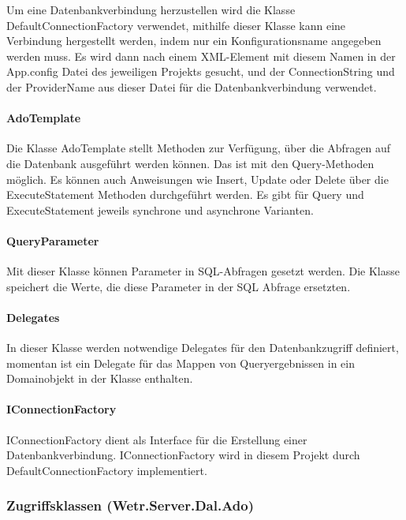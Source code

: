 Um eine Datenbankverbindung herzustellen wird die Klasse
DefaultConnectionFactory verwendet, mithilfe dieser Klasse kann eine
Verbindung hergestellt werden, indem nur ein Konfigurationsname
angegeben werden muss. Es wird dann nach einem XML-Element mit diesem
Namen in der App.config Datei des jeweiligen Projekts gesucht, und der
ConnectionString und der ProviderName aus dieser Datei für die
Datenbankverbindung verwendet.


\paragraph{AdoTemplate}\label{adotemplate}

Die Klasse AdoTemplate stellt Methoden zur Verfügung, über die Abfragen
auf die Datenbank ausgeführt werden können. Das ist mit den
Query-Methoden möglich. Es können auch Anweisungen wie Insert, Update
oder Delete über die ExecuteStatement Methoden durchgeführt werden. Es
gibt für Query und ExecuteStatement jeweils synchrone und asynchrone
Varianten.


\paragraph{QueryParameter}\label{queryparameter}

Mit dieser Klasse können Parameter in SQL-Abfragen gesetzt werden. Die
Klasse speichert die Werte, die diese Parameter in der SQL Abfrage
ersetzten.


\paragraph{Delegates}\label{delegates}

In dieser Klasse werden notwendige Delegates für den Datenbankzugriff
definiert, momentan ist ein Delegate für das Mappen von Queryergebnissen
in ein Domainobjekt in der Klasse enthalten.

\paragraph{IConnectionFactory}\label{iconnectionfactory}

IConnectionFactory dient als Interface für die Erstellung einer
Datenbankverbindung. IConnectionFactory wird in diesem Projekt durch
DefaultConnectionFactory implementiert.


\subsubsection{Zugriffsklassen
(Wetr.Server.Dal.Ado)}\label{zugriffsklassen-wetr.server.dal.ado}

